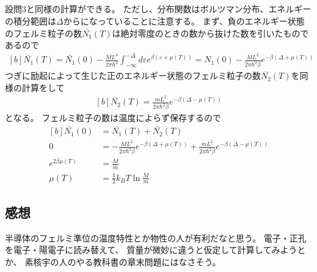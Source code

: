 \documentclass[../../sp_2013.tex]{subfiles}
\begin{document}
\subsection{}
設問3と同様の計算ができる。
ただし、分布関数はボルツマン分布、エネルギーの積分範囲は\(\Delta\)からになっていることに注意する。
まず、負のエネルギー状態のフェルミ粒子の数\(\bar{N_1}(T)\)は絶対零度のときの数から抜けた数を引いたものであるので
\begin{equation}\begin{aligned}[b]
    \bar{N_1}(T) = \bar{N_1}(0)-\frac{ML^2}{2\pi\hbar^2}\int_{-\infty}^{-\Delta}d\varepsilon e^{\beta(\varepsilon+\mu(T))}
    =N_1(0)-\frac{ML^2}{2\pi\hbar^2\beta}e^{-\beta(\Delta+\mu(T))}
\end{aligned}\end{equation}
つぎに励起によって生じた正のエネルギー状態のフェルミ粒子の数\(\bar{N_2}(T)\)を同様の計算をして
\begin{equation}\begin{aligned}[b]
    \bar{N_2}(T) = \frac{mL^2}{2\pi\hbar^2 \beta}e^{-\beta(\Delta-\mu(T))}
\end{aligned}\end{equation}
となる。
フェルミ粒子の数は温度によらず保存するので
\begin{equation}\begin{aligned}[b]
    \bar{N_1}(0) &= \bar{N_1}(T)+\bar{N_2}(T)\\
    0 &= -\frac{ML^2}{2\pi\hbar^2\beta}e^{-\beta(\Delta+\mu(T))}+\frac{mL^2}{2\pi\hbar^2\beta}e^{-\beta(\Delta-\mu(T))}\\
    e^{2\beta\mu(T)} &= \frac{M}{m}\\
    \mu(T) &= \frac{1}{2}k_BT\ln\frac{M}{m}
\end{aligned}\end{equation}


\subsection*{感想}
半導体のフェルミ準位の温度特性とか物性の人が有利だなと思う。
電子・正孔を電子・陽電子に読み替えて、
質量が微妙に違うと仮定して計算してみようとか、
素核宇の人のやる教科書の章末問題にはなさそう。
\end{document}

